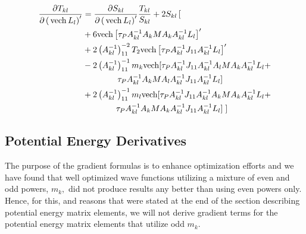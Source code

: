 \documentclass[12pt]{article}
\begin{document}
\begin{align}
\frac{\partial T_{kl}}{\partial\left(  \,\mathrm{vech}\,L_{l}\right)
^{\prime}}  & =\frac{\partial S_{kl}}{\partial\left(  \,\mathrm{vech}%
\,L_{l}\right)  ^{\prime}}\frac{T_{kl}}{S_{kl}}+2S_{kl}\left[
\begin{array}
[c]{c}
\end{array}
\right.  \nonumber\\
& +6\mathrm{vech}\left[  \tau_{P}A_{kl}^{-1}A_{k}MA_{k}A_{kl}^{-1}%
L_{l}\right]  ^{\prime}\nonumber\\
& +2\left(  A_{kl}^{-1}\right)  _{11}^{-2}T_{2}\mathrm{vech}\left[  \tau
_{P}A_{kl}^{-1}J_{11}A_{kl}^{-1}L_{l}\right]  ^{\prime}\nonumber\\
& -2\left(  A_{kl}^{-1}\right)  _{11}^{-1}m_{k}\mathrm{vech[}\tau_{P}%
A_{kl}^{-1}J_{11}A_{kl}^{-1}A_{l}MA_{k}A_{kl}^{-1}L_{l}+\nonumber\\
& \quad\quad\quad\,\quad\tau_{P}A_{kl}^{-1}A_{k}MA_{l}A_{kl}^{-1}J_{11}%
A_{kl}^{-1}L_{l}]\nonumber\\
& +2\left(  A_{kl}^{-1}\right)  _{11}^{-1}m_{l}\mathrm{vech[}\tau_{P}%
A_{kl}^{-1}J_{11}A_{kl}^{-1}A_{k}MA_{k}A_{kl}^{-1}L_{l}+\nonumber\\
& \quad\quad\quad\quad\tau_{P}A_{kl}^{-1}A_{k}MA_{k}A_{kl}^{-1}J_{11}%
A_{kl}^{-1}L_{l}]\left.
\begin{array}
[c]{c}
\end{array}
\right]
\end{align}

\subsection{Potential Energy Derivatives}

The purpose of the gradient formulas is to enhance optimization efforts and we
have found that well optimized wave functions utilizing a mixture of even and
odd powers, $m_{k},$ did not produce results any better than using even powers
only. Hence, for this, and reasons that were stated at the end of the section
describing potential energy matrix elements, we will not derive gradient terms
for the potential energy matrix elements that utilize odd $m_{k}.$
\end{document}
